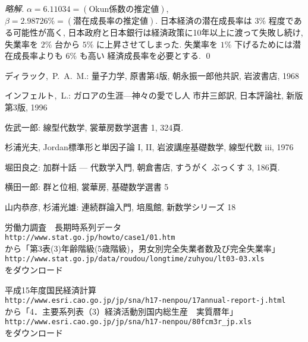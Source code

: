 \documentclass[12pt,twoside]{jarticle}
\newcommand\commentout[1]{#1}
\newcommand\commentout[1]{}
\begin{document}
\commentout{
\begin{proof}[略解]
  $\alpha=6.11034=(\text{Okun係数の推定値})$, 
  $\beta=2.98726\%=(\text{潜在成長率の推定値})$.
  日本経済の潜在成長率は $3\%$ 程度である可能性が高く,
  日本政府と日本銀行は経済政策に10年以上に渡って失敗し続け,
  失業率を $2\%$ 台から $5\%$ に上昇させてしまった.
  失業率を $1\%$ 下げるためには潜在成長率よりも $6\%$ も高い
  経済成長率を必要とする.
  \qed
\end{proof}
}


\begin{thebibliography}{ABC}

ディラック,~P.~A.~M.:
量子力学, 原書第4版,
朝永振一郎他共訳, 
岩波書店, 1968

インフェルト,~L.:
ガロアの生涯—神々の愛でし人
市井三郎訳, 
日本評論社, 新版第3版, 1996


 佐武一郎: 線型代数学, 裳華房数学選書 1, 324頁.

杉浦光夫, Jordan標準形と単因子論 I, II, 岩波講座基礎数学, 線型代数 iii, 1976


 堀田良之: 加群十話 --- 代数学入門, 朝倉書店, すうがく
ぶっくす 3, 186頁.


横田一郎: 群と位相, 裳華房, 基礎数学選書 5

山内恭彦, 杉浦光雄: 連続群論入門, 培風館, 新数学シリーズ 18

労働力調査　長期時系列データ \\
{\tt http://www.stat.go.jp/howto/case1/01.htm} \\
から「第3表(3)年齢階級(5歳階級)，男女別完全失業者数及び完全失業率」 \\
{\tt http://www.stat.go.jp/data/roudou/longtime/zuhyou/lt03-03.xls} \\
をダウンロード

平成15年度国民経済計算 \\
{\tt http://www.esri.cao.go.jp/jp/sna/h17-nenpou/17annual-report-j.html} \\
から「4．主要系列表（3）経済活動別国内総生産　実質暦年」\\
{\tt http://www.esri.cao.go.jp/jp/sna/h17-nenpou/80fcm3r\verb,_,jp.xls} \\
をダウンロード

\end{thebibliography}

\end{document}

